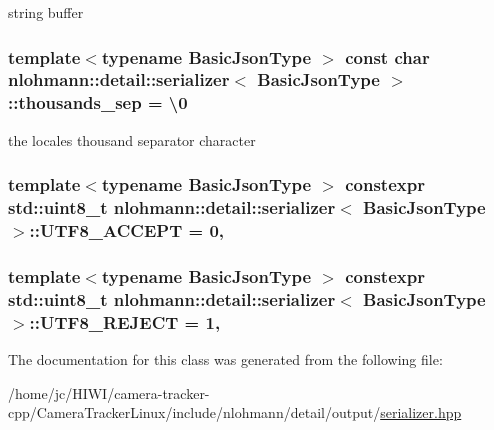 string buffer 

\subsubsection[{\texorpdfstring{thousands\+\_\+sep}{thousands_sep}}]{\setlength{\rightskip}{0pt plus 5cm}template$<$typename Basic\+Json\+Type $>$ const char {\bf nlohmann\+::detail\+::serializer}$<$ Basic\+Json\+Type $>$\+::thousands\+\_\+sep = \textquotesingle{}\textbackslash{}0\textquotesingle{}\hspace{0.3cm}{\ttfamily [private]}}\hypertarget{classnlohmann_1_1detail_1_1serializer_a78a6ae833bb6cf7f00cb0d51db114b14}{}\label{classnlohmann_1_1detail_1_1serializer_a78a6ae833bb6cf7f00cb0d51db114b14}


the locale\textquotesingle{}s thousand separator character 

\subsubsection[{\texorpdfstring{U\+T\+F8\+\_\+\+A\+C\+C\+E\+PT}{UTF8_ACCEPT}}]{\setlength{\rightskip}{0pt plus 5cm}template$<$typename Basic\+Json\+Type $>$ constexpr std\+::uint8\+\_\+t {\bf nlohmann\+::detail\+::serializer}$<$ Basic\+Json\+Type $>$\+::U\+T\+F8\+\_\+\+A\+C\+C\+E\+PT = 0\hspace{0.3cm}{\ttfamily [static]}, {\ttfamily [private]}}\hypertarget{classnlohmann_1_1detail_1_1serializer_a2311a8c756c4a119aa82cd55301d13bc}{}\label{classnlohmann_1_1detail_1_1serializer_a2311a8c756c4a119aa82cd55301d13bc}
\subsubsection[{\texorpdfstring{U\+T\+F8\+\_\+\+R\+E\+J\+E\+CT}{UTF8_REJECT}}]{\setlength{\rightskip}{0pt plus 5cm}template$<$typename Basic\+Json\+Type $>$ constexpr std\+::uint8\+\_\+t {\bf nlohmann\+::detail\+::serializer}$<$ Basic\+Json\+Type $>$\+::U\+T\+F8\+\_\+\+R\+E\+J\+E\+CT = 1\hspace{0.3cm}{\ttfamily [static]}, {\ttfamily [private]}}\hypertarget{classnlohmann_1_1detail_1_1serializer_a833bd5805e4380549f4e21c304820d6d}{}\label{classnlohmann_1_1detail_1_1serializer_a833bd5805e4380549f4e21c304820d6d}


The documentation for this class was generated from the following file\+:\begin{DoxyCompactItemize}
\item 
/home/jc/\+H\+I\+W\+I/camera-\/tracker-\/cpp/\+Camera\+Tracker\+Linux/include/nlohmann/detail/output/\hyperlink{serializer_8hpp}{serializer.\+hpp}\end{DoxyCompactItemize}

